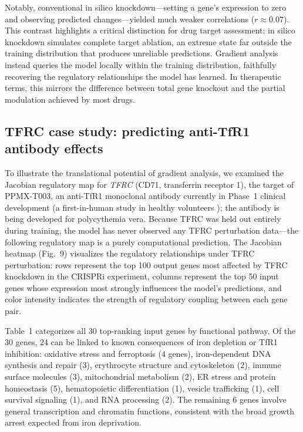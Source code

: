 \documentclass[12pt,a4paper]{article}
\begin{document}
Notably, conventional in silico knockdown---setting a gene's expression to zero and observing predicted changes---yielded much weaker correlations ($r \approx 0.07$). This contrast highlights a critical distinction for drug target assessment: in silico knockdown simulates complete target ablation, an extreme state far outside the training distribution that produces unreliable predictions. Gradient analysis instead queries the model locally within the training distribution, faithfully recovering the regulatory relationships the model has learned. In therapeutic terms, this mirrors the difference between total gene knockout and the partial modulation achieved by most drugs.

\subsection{TFRC case study: predicting anti-TfR1 antibody effects}

To illustrate the translational potential of gradient analysis, we examined the Jacobian regulatory map for \textit{TFRC} (CD71, transferrin receptor 1), the target of PPMX-T003, an anti-TfR1 monoclonal antibody currently in Phase~1 clinical development (a first-in-human study in healthy volunteers \citep{ogama2023}); the antibody is being developed for polycythemia vera. Because TFRC was held out entirely during training, the model has never observed any TFRC perturbation data---the following regulatory map is a purely computational prediction. The Jacobian heatmap (Fig.~9) visualizes the regulatory relationships under TFRC perturbation: rows represent the top 100 output genes most affected by TFRC knockdown in the CRISPRi experiment, columns represent the top 50 input genes whose expression most strongly influences the model's predictions, and color intensity indicates the strength of regulatory coupling between each gene pair.

Table~1 categorizes all 30 top-ranking input genes by functional pathway. Of the 30 genes, 24 can be linked to known consequences of iron depletion or TfR1 inhibition: oxidative stress and ferroptosis (4 genes), iron-dependent DNA synthesis and repair (3), erythrocyte structure and cytoskeleton (2), immune surface molecules (3), mitochondrial metabolism (2), ER stress and protein homeostasis (5), hematopoietic differentiation (1), vesicle trafficking (1), cell survival signaling (1), and RNA processing (2). The remaining 6 genes involve general transcription and chromatin functions, consistent with the broad growth arrest expected from iron deprivation.
\end{document}
